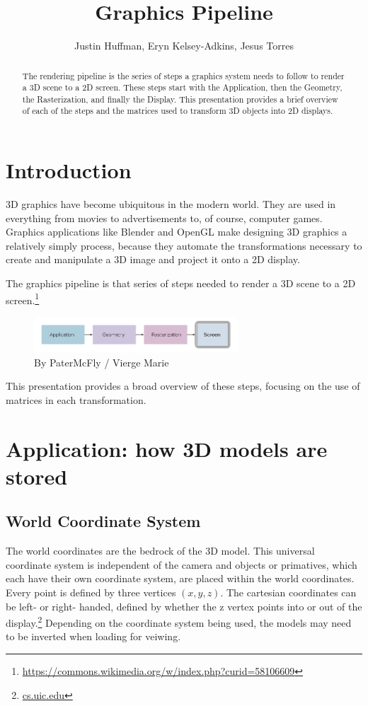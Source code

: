 \documentclass{article}
\begin{document}
\title{Graphics Pipeline}
\author{Justin Huffman, Eryn Kelsey-Adkins, Jesus Torres}

\maketitle

\begin{abstract}
The rendering pipeline is the series of steps a graphics system needs to follow to render a 3D scene to a 2D screen. These steps start with the Application, then the Geometry, the Rasterization, and finally the Display. This presentation provides a brief overview of each of the steps and the matrices used to transform 3D objects into 2D displays.
\end{abstract}

\section{Introduction}
3D graphics have become ubiquitous in the modern world. They are used in everything from movies to advertisements to, of course, computer games. Graphics applications like Blender and OpenGL make designing 3D graphics a relatively simply process, because they automate the transformations necessary to create and manipulate a 3D image and project it onto a 2D display.

The graphics pipeline is that series of steps needed to render a 3D scene to a 2D screen.\footnote{\url{https://commons.wikimedia.org/w/index.php?curid=58106609}}

\begin{figure}[H]
    \centering
    \includegraphics[width=3.0in]{Graphics_pipeline_2_en.png}
    \caption{By PaterMcFly / Vierge Marie}
    \label{pipeline}
\end{figure} 

This presentation provides a broad overview of these steps, focusing on the use of matrices in each transformation.

\section{Application: how 3D models are stored}

\subsection{World Coordinate System}
The world coordinates are the bedrock of the 3D model. This universal coordinate system is independent of the camera and objects or primatives, which each have their own coordinate system, are placed within the world coordinates. Every point is defined by three vertices $(x, y, z)$. The cartesian coordinates can be left- or right- handed, defined by whether the z vertex points into or out of the display.\footnote{\url{cs.uic.edu}} Depending on the coordinate system being used, the models may need to be inverted when loading for veiwing.
\end{document}
